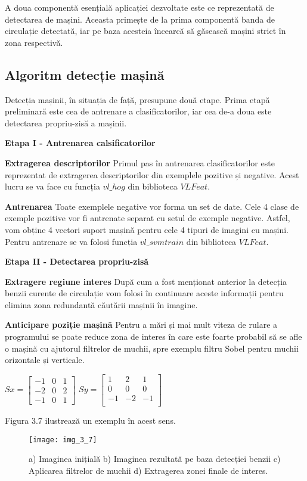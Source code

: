A doua componentă esențială aplicației dezvoltate este ce reprezentată de detectarea de mașini. Aceasta primește de la prima componentă banda de circulație detectată, iar pe baza acesteia încearcă să găsească mașini strict în zona respectivă.
\subsection{Algoritm detecție mașină}
Detecția mașinii, în situația de față, presupune două etape. Prima etapă preliminară este cea de antrenare a clasificatorilor, iar cea de-a doua este detectarea propriu-zisă a mașinii.

\textbf{Etapa I - Antrenarea calsificatorilor}

\textbf{Extragerea descriptorilor}
Primul pas în antrenarea clasificatorilor este reprezentat de extragerea descriptorilor din exemplele pozitive și negative. 
Acest lucru se va face cu funcția $vl\_hog$ din biblioteca $VLFeat$. 

\textbf{Antrenarea}
Toate exemplele negative vor forma un set de date. Cele 4 clase de exemple pozitive vor fi antrenate separat cu setul de exemple negative. Astfel, vom obține 4 vectori suport mașină pentru cele 4 tipuri de imagini cu mașini. 
Pentru antrenare se va folosi funcția $vl\_svmtrain$ din biblioteca $VLFeat$.

\textbf{Etapa II - Detectarea propriu-zisă}

\textbf{Extragere regiune interes}
După cum a fost menționat anterior la detecția benzii curente de circulație vom folosi în continuare aceste informații pentru elimina zona redundantă căutării mașinii în imagine.

\textbf{Anticipare poziție mașină}
Pentru a mări și mai mult viteza de rulare a programului se poate reduce zona de interes în care este foarte probabil să se afle o mașină cu ajutorul filtrelor de muchii, spre exemplu filtru Sobel pentru muchii orizontale și verticale.
\begin{center}
	$ Sx = 
	\begin{bmatrix}
	-1 & 0 & 1 \\
	-2 & 0 & 2 \\
	-1 & 0 & 1
	\end{bmatrix}
	$
	$ Sy = 
	\begin{bmatrix}
	1 & 2 & 1 \\
	0 & 0 & 0 \\
	-1 & -2 & -1 \\
	\end{bmatrix}
	$
\end{center}
Figura 3.7 ilustrează un exemplu în acest sens.
\begin{figure}[!h]
	\centering
	\texttt{[image: img\_3\_7]}
	\caption[Regiune interes detecție mașină]{a) Imaginea inițială b) Imaginea rezultată pe baza detecției benzii c) Aplicarea filtrelor de muchii d) Extragerea zonei finale de interes.}
\end{figure}


